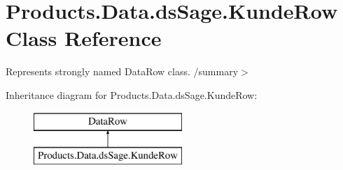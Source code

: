 \hypertarget{class_products_1_1_data_1_1ds_sage_1_1_kunde_row}{}\section{Products.\+Data.\+ds\+Sage.\+Kunde\+Row Class Reference}
\label{class_products_1_1_data_1_1ds_sage_1_1_kunde_row}


Represents strongly named Data\+Row class. /summary$>$  


Inheritance diagram for Products.\+Data.\+ds\+Sage.\+Kunde\+Row\+:\begin{figure}[H]
\begin{center}
\leavevmode
\includegraphics[height=2.000000cm]{class_products_1_1_data_1_1ds_sage_1_1_kunde_row}
\end{center}
\end{figure}
